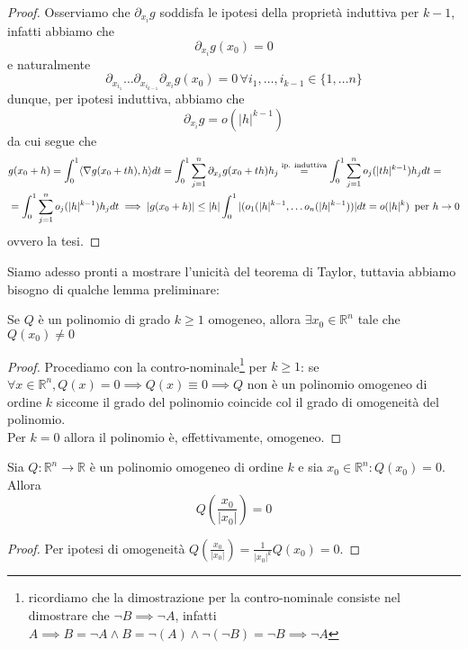 \documentclass[openany, italian]{book}
\begin{document}
\begin{proof}
Osserviamo che $\partial_{x_i} g$ soddisfa le ipotesi della proprietà induttiva per $k-1$, infatti abbiamo che
$$
\partial_{x_i} g(x_0) = 0
$$
e naturalmente
$$
\partial_{x_{i_1}} \ldots \partial_{x_{i_{k-1}}} \partial_{x_i} g(x_0) = 0 \, \forall i_1, \ldots, i_{k-1} \in \{1, \ldots n\}
$$
dunque, per ipotesi induttiva, abbiamo che
$$
\partial_{x_i} g = o(|h|^{k-1})
$$
da cui segue che
\begin{align*}
&g(x_0 + h) = \int_0^1 \langle \nabla g(x_0 + th), h \rangle dt = \int_0^1 \sum_{j=1}^n \partial_{x_j} g(x_0 + th)h_j \stackrel{\text{ip. induttiva}}{=} \int_0^1 \sum_{j=1}^n o_j(|th|^{k-1})h_j dt = \\ &= \int_0^1 \sum_{j=1}^n o_j(|h|^{k-1})h_j dt \implies |g(x_0+h)| \leq |h| \int_0^1 |(o_1(|h|^{k-1}, \ldots o_n(|h|^{k-1}))|dt = o(|h|^k) \, \text{ per } h \to 0
\end{align*}
ovvero la tesi.
\end{proof}
Siamo adesso pronti a mostrare l'unicità del teorema di Taylor, tuttavia abbiamo bisogno di qualche lemma preliminare:
\begin{lemma}
Se $Q$ è un polinomio di grado $k \geq 1$ omogeneo, allora $\exists x_0 \in \mathbb{R}^n$ tale che $Q(x_0) \neq 0$ 
\end{lemma}
\begin{proof}
Procediamo con la contro-nominale\footnote{ricordiamo che la dimostrazione per la contro-nominale consiste nel dimostrare che $\neg B \implies \neg A$, infatti $A \implies B = \neg A \wedge B = \neg{(A)} \wedge \neg(\neg B) = \neg B \implies \neg A$} per $k \geq 1$: se $\forall x \in \mathbb{R}^n, Q(x) = 0 \implies Q(x) \equiv 0 \implies Q$ non è un polinomio omogeneo di ordine $k$ siccome il grado del polinomio coincide col il grado di omogeneità del polinomio. \\
Per $k=0$ allora il polinomio è, effettivamente, omogeneo.
\end{proof}
\begin{cor}
Sia $Q: \mathbb{R}^n \to \mathbb{R}$ è un polinomio omogeneo di ordine $k$ e sia $x_0 \in \mathbb{R}^n : Q(x_0) = 0$. Allora
$$
Q \left( \frac{x_0}{|x_0|} \right) = 0
$$
\end{cor}
\begin{proof}
Per ipotesi di omogeneità $Q(\frac{x_0}{|x_0|}) = \frac{1}{|x_0|^k}Q(x_0) = 0$.
\end{proof}
\end{document}
